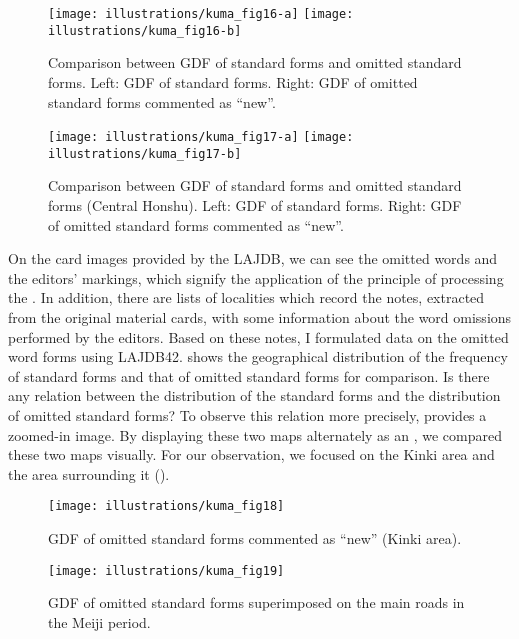 \documentclass[output=paper]{LSP/langsci}
\begin{document}
\begin{figure}
\texttt{[image: illustrations/kuma\_fig16-a]}
\texttt{[image: illustrations/kuma\_fig16-b]}
\caption{Comparison between GDF of standard forms and omitted standard forms. Left: GDF of standard forms. Right: GDF of omitted standard forms commented as “new”.}          
\label{fig:kuma:16}
\end{figure}

\begin{figure}
\texttt{[image: illustrations/kuma\_fig17-a]}
\texttt{[image: illustrations/kuma\_fig17-b]}
\caption{Comparison between GDF of standard forms and omitted standard forms (Central Honshu). Left: GDF of standard forms. Right: GDF of omitted standard forms commented as “new”.}          
\label{fig:kuma:17}
\end{figure}
 
On the card images provided by the LAJDB, we can see the omitted words and the editors’ markings, which signify the application of the principle of processing the . In addition, there are lists of localities which record the notes, extracted from the original material cards, with some information about the word omissions performed by the editors. Based on these notes, I formulated data on the omitted word forms using LAJDB42.  shows the geographical distribution of the frequency of standard forms and that of omitted standard forms for comparison. Is there any relation between the distribution of the standard forms and the distribution of omitted standard forms? To observe this relation more precisely,  provides a zoomed-in image. By displaying these two maps alternately as an , we compared these two maps visually. For our observation, we focused on the Kinki area and the area surrounding it (). 

\begin{figure}
\texttt{[image: illustrations/kuma\_fig18]}
\caption{GDF of omitted standard forms commented as “new” (Kinki area).}          
\label{fig:kuma:18}
\end{figure}

\begin{figure}[b]
\texttt{[image: illustrations/kuma\_fig19]}
\caption{GDF of omitted standard forms superimposed on the main roads in the Meiji period.}          
\label{fig:kuma:19}
\end{figure}             
\end{document}
